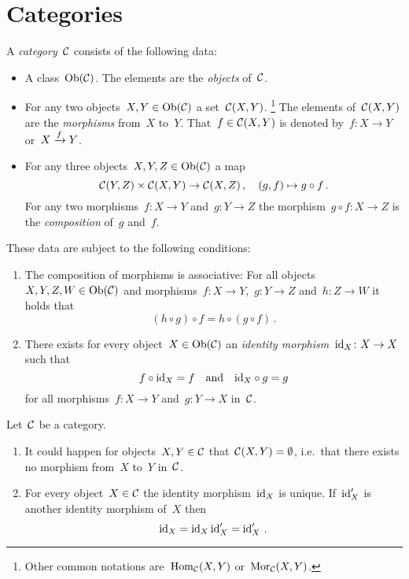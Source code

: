 \section{Categories}

\begin{definition}
  A \emph{category}~$\mathcal{C}$ consists of the following data:
  \begin{itemize}
    \item
      A class~$\operatorname{Ob}(\mathcal{C})$.
      The elements are the \emph{objects} of~$\mathcal{C}$.
    \item
      For any two objects~$X, Y \in \operatorname{Ob}(\mathcal{C})$ a set~$\mathcal{C}(X,Y)$.%
      \footnote{Other common notations are~$\operatorname{Hom}_{\mathcal{C}}(X,Y)$ or~$\operatorname{Mor}_{\mathcal{C}}(X,Y)$.}
      The elements of~$\mathcal{C}(X, Y)$ are the \emph{morphisms} from~$X$ to~$Y$.
      That~$f \in \mathcal{C}(X,Y)$ is denoted by~$f \colon X \to Y$ or~$X \xrightarrow{f} Y$.
    \item
      For any three objects~$X, Y, Z \in \operatorname{Ob}(\mathcal{C})$ a map
      \[
                \mathcal{C}(Y,Z) \times \mathcal{C}(X,Y)
        \to     \mathcal{C}(X,Z) \,,
        \quad   (g, f)
        \mapsto g \circ f \,.
      \]
      For any two morphisms~$f \colon X \to Y$ and~$g \colon Y \to Z$ the morphism~$g \circ f \colon X \to Z$ is the \emph{composition} of~$g$ and~$f$.
  \end{itemize}
  These data are subject to the following conditions:
  \begin{enumerate}[label=(C\arabic*)]
    \item
      The composition of morphisms is associative:
      For all objects~$X, Y, Z, W \in \operatorname{Ob}(\mathcal{C})$ and morphisms~$f \colon X \to Y$,~$g \colon Y \to Z$ and~$h \colon Z \to W$ it holds that
      \[
          (h \circ g) \circ f
        = h \circ (g \circ f) \,.
      \]
    \item
      There exists for every object~$X \in \operatorname{Ob}(\mathcal{C})$ an \emph{identity morphism}~$\operatorname{id}_X \colon X \to X$ such that
      \[
        f \circ {\operatorname{id}_X} = f
        \quad\text{and}\quad
        {\operatorname{id}_X} \circ g = g
      \]
      for all morphisms~$f \colon X \to Y$ and~$g \colon Y \to X$ in~$\mathcal{C}$.
  \end{enumerate}
\end{definition}


\begin{remark}
  Let~$\mathcal{C}$ be a category.
  \begin{enumerate}
    \item
      It could happen for objects~$X, Y \in \mathcal{C}$ that~$\mathcal{C}(X,Y) = \emptyset$, i.e.\ that there exists no morphism from~$X$ to~$Y$ in~$\mathcal{C}$.
    \item
      For every object~$X \in \mathcal{C}$ the identity morphism~$\operatorname{id}_X$ is unique.
      If~$\operatorname{id}'_X$ is another identity morphism of~$X$ then
      \[
          \operatorname{id}_X
        = \operatorname{id}_X \operatorname{id}'_X
        = \operatorname{id}'_X \,.
      \]
  \end{enumerate}
\end{remark}


